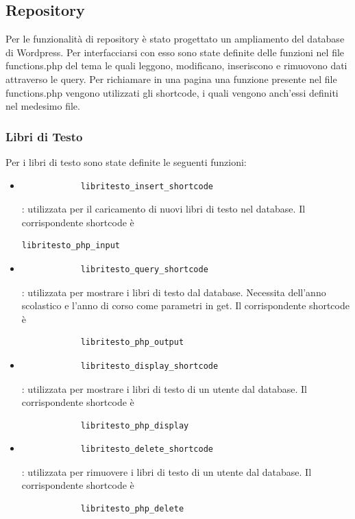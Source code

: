 \documentclass{article}
\begin{document}
	\subsection{\textbf{Repository}}
	Per le funzionalità di repository è stato progettato un ampliamento del database di Wordpress. Per interfacciarsi con esso sono state definite delle funzioni nel file functions.php del tema le quali leggono, modificano, inseriscono e rimuovono dati attraverso le query. Per richiamare in una pagina una funzione presente nel file functions.php vengono utilizzati gli shortcode, i quali vengono anch'essi definiti nel medesimo file.
		\subsubsection{\textbf{Libri di Testo}}
		Per i libri di testo sono state definite le seguenti funzioni:
		\begin{itemize}
			\item \begin{verbatim}
			libritesto_insert_shortcode
			\end{verbatim}: utilizzata per il caricamento di nuovi libri di testo nel database.
			Il corrispondente shortcode è \begin{verbatim}libritesto_php_input\end{verbatim}
			\item \begin{verbatim}
			libritesto_query_shortcode
			\end{verbatim}: utilizzata per mostrare i libri di testo dal database. Necessita dell'anno scolastico e l'anno di corso come parametri in get. Il corrispondente shortcode è \begin{verbatim}
			libritesto_php_output
			\end{verbatim}
			\item \begin{verbatim}
			libritesto_display_shortcode
			\end{verbatim}: utilizzata per mostrare i libri di testo di un utente dal database. Il corrispondente shortcode è \begin{verbatim}
			libritesto_php_display
			\end{verbatim}
			\item \begin{verbatim}
			libritesto_delete_shortcode
			\end{verbatim}: utilizzata per rimuovere i libri di testo di un utente dal database. Il corrispondente shortcode è \begin{verbatim}
			libritesto_php_delete
			\end{verbatim}
		\end{itemize}
\end{document}
